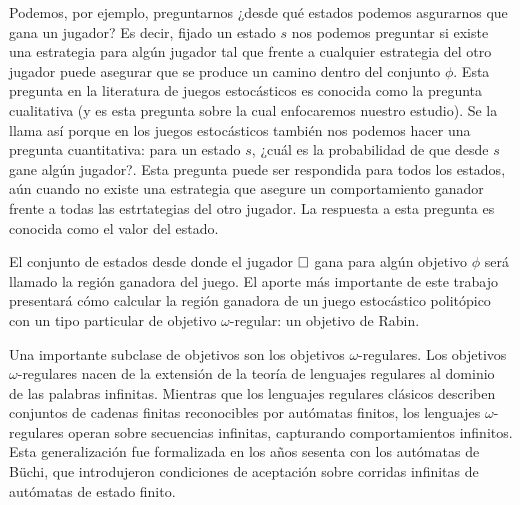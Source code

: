 Podemos, por ejemplo, preguntarnos ¿desde qué estados podemos asgurarnos que
gana un jugador? Es decir, fijado un estado $s$ nos podemos preguntar si existe
una estrategia para algún jugador tal que frente a cualquier estrategia del
otro jugador puede asegurar que se produce un camino dentro del conjunto
$\phi$. Esta pregunta en la literatura de juegos estocásticos es conocida como
la pregunta cualitativa (y es esta pregunta sobre la cual enfocaremos nuestro
estudio). Se la llama así porque en los juegos estocásticos también nos podemos
hacer una pregunta cuantitativa: para un estado $s$, ¿cuál es la probabilidad
de que desde $s$ gane algún jugador?. Esta pregunta puede ser respondida para
todos los estados, aún cuando no existe una estrategia que asegure un
comportamiento ganador frente a todas las estrtategias del otro jugador. La
respuesta a esta pregunta es conocida como el valor del estado.

El conjunto de estados desde donde el jugador $\square$ gana para algún objetivo
$\phi$ será llamado la región ganadora del juego. El aporte más importante de
este trabajo presentará cómo calcular la región ganadora de un juego
estocástico politópico con un tipo particular de objetivo $\omega$-regular: un
objetivo de Rabin.


Una importante subclase de objetivos son los objetivos $\omega$-regulares. Los
objetivos $\omega$-regulares nacen de la extensión de la teoría de lenguajes
regulares al dominio de las palabras infinitas. Mientras que los lenguajes
regulares clásicos describen conjuntos de cadenas finitas reconocibles por
autómatas finitos, los lenguajes $\omega$-regulares operan sobre secuencias
infinitas, capturando comportamientos infinitos. Esta generalización fue
formalizada en los años sesenta con los autómatas de Büchi, que introdujeron
condiciones de aceptación sobre corridas infinitas de autómatas de estado
finito.

